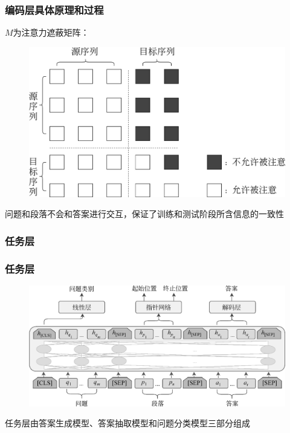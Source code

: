 \documentclass{beamer}
\begin{document}
\begin{frame}
    \frametitle{编码层具体原理和过程}

    $M$为注意力遮蔽矩阵：

    \begin{figure}
        \centering
        \includegraphics{./fig/mask.jpg}
    \end{figure}

    问题和段落不会和答案进行交互，保证了训练和测试阶段所含信息的一致性

\end{frame}

\subsubsection{任务层}
\begin{frame}
    \frametitle{任务层}

    \begin{figure}
        \centering
        \includegraphics{./fig/model.jpg}
    \end{figure}

    任务层由答案生成模型、答案抽取模型和问题分类模型三部分组成

\end{frame}
\end{document}
